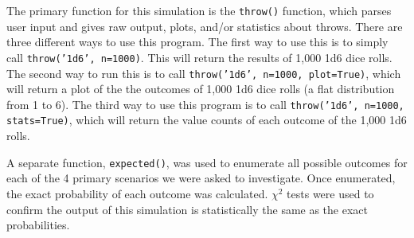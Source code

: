 \documentclass{article}
\begin{document}
The primary function for this simulation is the \texttt{throw()} function, which parses user input and gives raw output, plots, and/or statistics about throws. There are three different ways to use this program. The first way to use this is to simply call \texttt{throw('1d6', n=1000)}. This will return the results of 1,000 1d6 dice rolls. The second way to run this is to call \texttt{throw('1d6', n=1000, plot=True)}, which will return a plot of the the outcomes of 1,000 1d6 dice rolls (a flat distribution from 1 to 6). The third way to use this program is to call \texttt{throw('1d6', n=1000, stats=True)}, which will return the value counts of each outcome of the 1,000 1d6 rolls.

A separate function, \texttt{expected()}, was used to enumerate all possible outcomes for each of the 4 primary scenarios we were asked to investigate. Once enumerated, the exact probability of each outcome was calculated. $\chi^2$ tests were used to confirm the output of this simulation is statistically the same as the exact probabilities.

\end{document}
